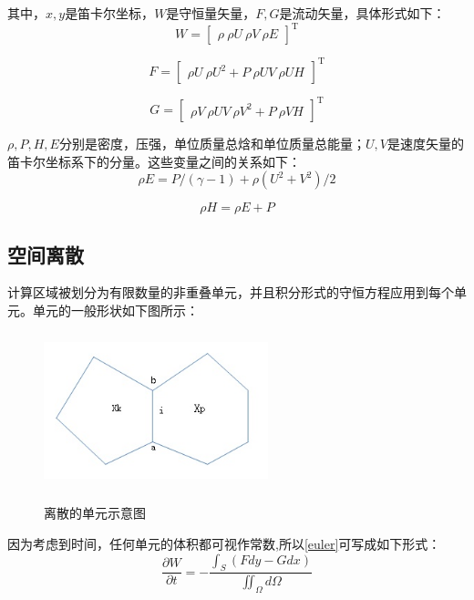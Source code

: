 \documentclass[UTF8]{ctexart}
\begin{document}
\indent 其中，$x,y$是笛卡尔坐标，$W$是守恒量矢量，$F,G$是流动矢量，具体形式如下：
\begin{equation}
W={\begin{bmatrix} \rho \ \rho U \ \rho V \ \rho E \end{bmatrix}}^\mathrm{T}
\end{equation}

\begin{equation}
F={\begin{bmatrix} \rho U \ \rho U^2 + P \ \rho UV \ \rho UH \end{bmatrix}}^\mathrm{T}
\end{equation}

\begin{equation}
G={\begin{bmatrix} \rho V \ \rho UV \ \rho V^2 + P \ \rho VH \end{bmatrix}}^\mathrm{T}
\end{equation}

\indent $\rho,P,H,E$分别是密度，压强，单位质量总焓和单位质量总能量；$U,V$是速度矢量的笛卡尔坐标系下的分量。这些变量之间的关系如下：
\begin{equation}
\rho E=P/(\gamma-1)+\rho (U^2+V^2)/2
\end{equation}

\begin{equation}
\rho H=\rho E + P
\end{equation}

\subsection{空间离散}
计算区域被划分为有限数量的非重叠单元，并且积分形式的守恒方程应用到每个单元。单元的一般形状如下图所示：
\begin{figure}[htbp]\centering\label{cell}
\includegraphics[width=6.5cm,height=4.5cm]{../data/cell.jpg}
\caption{离散的单元示意图}
\end{figure}

\indent 因为考虑到时间，任何单元的体积都可视作常数,所以\eqref{euler}可写成如下形式：
\begin{equation}\label{discrete}
\frac{\partial W}{\partial t} = - \frac{\int_S (Fdy-Gdx)}{\iint_{\Omega} d\Omega}
\end{equation}
\end{document}
